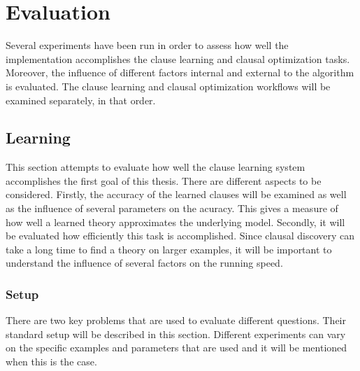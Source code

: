 \chapter{Evaluation}
\label{cha:evaluation}


Several experiments have been run in order to assess how well the implementation accomplishes the clause learning and clausal optimization tasks.
Moreover, the influence of different factors internal and external to the algorithm is evaluated.
The clause learning and clausal optimization workflows will be examined separately, in that order.

\section{Learning}

This section attempts to evaluate how well the clause learning system accomplishes the first goal of this thesis.
There are different aspects to be considered.
Firstly, the accuracy of the learned clauses will be examined as well as the influence of several parameters on the acuracy.
This gives a measure of how well a learned theory approximates the underlying model.
Secondly, it will be evaluated how efficiently this task is accomplished.
Since clausal discovery can take a long time to find a theory on larger examples, it will be important to understand the influence of several factors on the running speed.

\subsection{Setup}
There are two key problems that are used to evaluate different questions.
Their standard setup will be described in this section.
Different experiments can vary on the specific examples and parameters that are used and it will be mentioned when this is the case.

